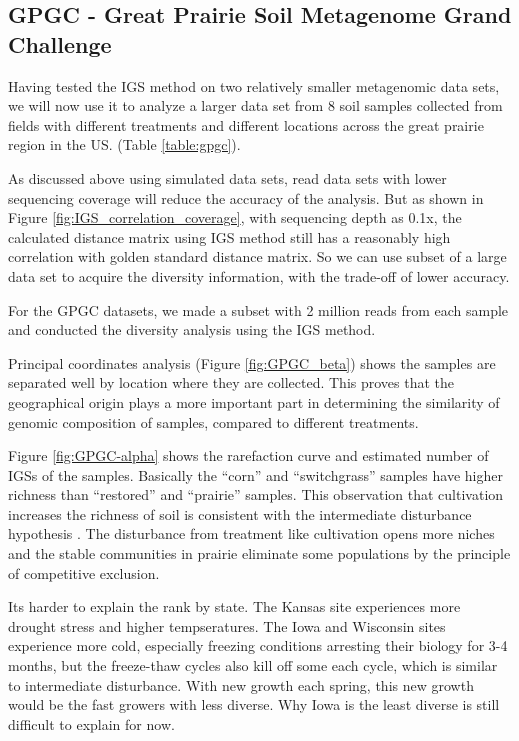 \subsection{GPGC - Great Prairie Soil Metagenome Grand Challenge}

Having tested the IGS method on two relatively smaller metagenomic data sets, 
we will now use it to analyze 
a larger data set from 8 soil samples collected from fields with different treatments and
different locations across the great prairie region in the US. 
(Table \ref{table:gpgc}). 



As discussed above using simulated data sets, read data sets with lower sequencing coverage will reduce
the accuracy of the analysis. But as shown in Figure \ref{fig:IGS_correlation_coverage}, with sequencing depth
as 0.1x, the calculated distance matrix using IGS method still has a reasonably high correlation with golden standard
distance matrix. So we can use subset of a large data set to acquire the diversity information, with the trade-off of
lower accuracy. 

For the GPGC datasets, we made a subset with 2 million reads from each sample 
and conducted the diversity analysis using the IGS method. 

Principal coordinates analysis (Figure \ref{fig:GPGC_beta}) shows the samples are 
separated well by location where they are collected.%
This proves that the geographical origin plays a more important part in 
determining the similarity of genomic composition of samples, compared to 
different treatments.

Figure \ref{fig:GPGC-alpha} shows the rarefaction curve and estimated number 
of IGSs of the samples. Basically the ``corn'' and ``switchgrass'' samples
have higher richness than ``restored'' and ``prairie'' samples. This observation 
that cultivation increases the richness of soil 
is consistent with the intermediate disturbance hypothesis \cite{wilkinson1999disturbing}. The disturbance 
from treatment like cultivation opens more niches and the stable 
communities in prairie eliminate some populations by the principle of 
competitive exclusion.

Its harder to explain the rank by state. 
The Kansas site experiences more drought stress and higher tempseratures. 
The Iowa and 
Wisconsin sites experience more cold, especially freezing conditions arresting 
their biology for 3-4 months, but the freeze-thaw cycles also kill off 
some each cycle, which is similar to intermediate disturbance. With new 
growth each spring, this new growth would be the fast growers with 
less diverse. Why Iowa is the least diverse is still difficult to explain for now.

